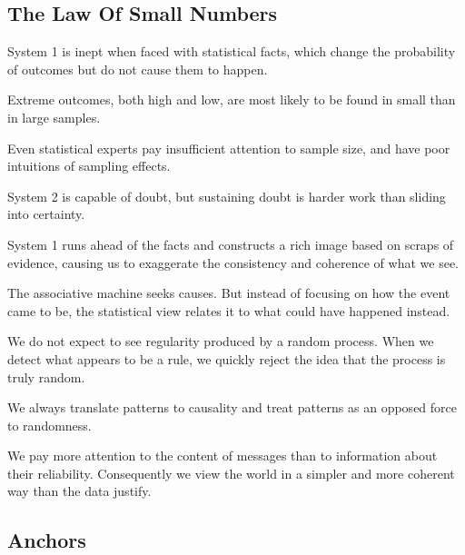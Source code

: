 \subsection*{The Law Of Small Numbers}
\bit
\item System 1 is inept when faced with statistical facts, which change the probability of outcomes but do not cause
them to happen.
\item Extreme outcomes, both high and low, are most likely to be found in small than in large samples.
\item Even statistical experts pay insufficient attention to sample size, and have poor intuitions of sampling effects.
\item System 2 is capable of doubt, but sustaining doubt is harder work than sliding into certainty.
\item System 1 runs ahead of the facts and constructs a rich image based on scraps of evidence, causing us to
exaggerate the consistency and coherence of what we see.
\item The associative machine seeks causes. But instead of focusing on how the event came to be, the statistical view
relates it to what could have happened instead.
\item We do not expect to see regularity produced by a random process. When we detect what appears to be a rule, we
quickly reject the idea that the process is truly random.
\item We always translate patterns to causality and treat patterns as an opposed force to randomness.
\item We pay more attention to the content of messages than to information about their reliability. Consequently we
view the world in a simpler and more coherent way than the data justify.
\eit

\subsection*{Anchors}

